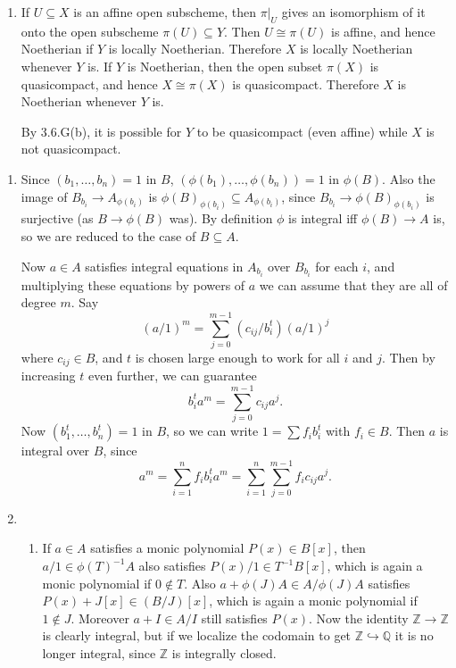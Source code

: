 \documentclass{report}
\newcommand{\Z}{\mathbb{Z}}
\newcommand{\Q}{\mathbb{Q}}
\begin{document}
\begin{enumerate}[label=\textbf{7.1.\Alph*.}]
	\item If $U\subseteq X$ is an affine open subscheme, then $\pi|_U$ gives an
	      isomorphism of it onto the open subscheme $\pi(U)\subseteq Y$. Then
	      $U\cong\pi(U)$ is affine, and hence Noetherian if $Y$ is locally
	      Noetherian. Therefore $X$ is locally Noetherian whenever $Y$ is. If $Y$
	      is Noetherian, then the open subset $\pi(X)$ is quasicompact, and hence
	      $X\cong\pi(X)$ is quasicompact. Therefore $X$ is Noetherian whenever $Y$
	      is.

	      By 3.6.G(b), it is possible for $Y$ to be quasicompact (even affine)
	      while $X$ is not quasicompact.
\end{enumerate}

\begin{enumerate}[label=\textbf{7.2.\Alph*.}]
	\item Since $(b_1,\ldots,b_n)=1$ in $B$, $(\phi(b_1),\ldots,\phi(b_n))=1$ in
	      $\phi(B)$. Also the image of $B_{b_i}\to A_{\phi(b_i)}$ is
	      $\phi(B)_{\phi(b_i)}\subseteq A_{\phi(b_i)}$, since
	      $B_{b_i}\to\phi(B)_{\phi(b_i)}$ is surjective (as $B\to\phi(B)$ was). By
	      definition $\phi$ is integral iff $\phi(B)\to A$ is, so we are reduced
	      to the case of $B\subseteq A$.

	      Now $a\in A$ satisfies integral equations in $A_{b_i}$ over $B_{b_i}$
	      for each $i$, and multiplying these equations by powers of $a$ we can
	      assume that they are all of degree $m$. Say
	      \begin{equation*}
		      (a/1)^m = \sum_{j=0}^{m-1}(c_{ij}/b_i^t)(a/1)^j
	      \end{equation*}
	      where $c_{ij}\in B$, and $t$ is chosen large enough to work for all $i$
	      and $j$. Then by increasing $t$ even further, we can guarantee
	      \begin{equation*}
		      b_i^ta^m = \sum_{j=0}^{m-1}c_{ij}a^j.
	      \end{equation*}
	      Now $(b_1^t,\ldots,b_n^t)=1$ in $B$, so we can write $1=\sum f_ib_i^t$
	      with $f_i\in B$. Then $a$ is integral over $B$, since
	      \begin{equation*}
		      a^m = \sum_{i=1}^nf_ib_i^ta^m =
		      \sum_{i=1}^n\sum_{j=0}^{m-1}f_ic_{ij}a^j.
	      \end{equation*}

	\item
	      \begin{enumerate}[label=(\alph*)]
		      \item If $a\in A$ satisfies a monic polynomial $P(x)\in B[x]$, then
		            $a/1\in\phi(T)^{-1}A$ also satisfies $P(x)/1\in T^{-1}B[x]$,
		            which is again a monic polynomial if $0\notin T$. Also
		            $a+\phi(J)A\in A/\phi(J)A$ satisfies $P(x)+J[x]\in(B/J)[x]$,
		            which is again a monic polynomial if $1\notin J$. Moreover
		            $a+I\in A/I$ still satisfies $P(x)$. Now the identity $\Z\to\Z$
		            is clearly integral, but if we localize the codomain to get
		            $\Z\hookrightarrow\Q$ it is no longer integral, since $\Z$ is
		            integrally closed.


\end{enumerate}
\end{enumerate}
\end{document}
